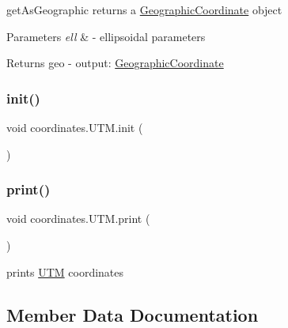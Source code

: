 get\+As\+Geographic returns a \hyperlink{classcoordinates_1_1_geographic_coordinate}{Geographic\+Coordinate} object 


\begin{DoxyParams}{Parameters}
{\em ell} & -\/ ellipsoidal parameters \\
\hline
\end{DoxyParams}
\begin{DoxyReturn}{Returns}
geo -\/ output\+: \hyperlink{classcoordinates_1_1_geographic_coordinate}{Geographic\+Coordinate} 
\end{DoxyReturn}
\mbox{\label{classcoordinates_1_1_u_t_m_acc60077a37c7b6f1d24c00401e97064d}} 
\subsubsection{\texorpdfstring{init()}{init()}}
{\footnotesize\ttfamily void coordinates.\+U\+T\+M.\+init (\begin{DoxyParamCaption}{ }\end{DoxyParamCaption})}

\mbox{\label{classcoordinates_1_1_u_t_m_a40435144851f7e23b573debd797e0e97}} 
\subsubsection{\texorpdfstring{print()}{print()}}
{\footnotesize\ttfamily void coordinates.\+U\+T\+M.\+print (\begin{DoxyParamCaption}{ }\end{DoxyParamCaption})}



prints \hyperlink{classcoordinates_1_1_u_t_m}{U\+TM} coordinates 



\subsection{Member Data Documentation}
\mbox{\label{classcoordinates_1_1_u_t_m_adb4ff0c8fbf9f7829c23fb4ca2abba64}} 
